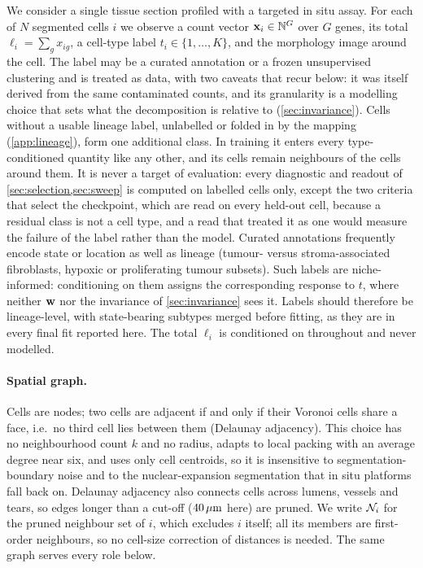  We consider a single tissue section profiled with a targeted in situ assay. For each of $N$ segmented cells $i$ we observe a count vector $\mathbf{x}_i \in \mathbb{N}^G$ over $G$ genes, its total $\ell_i = \sum_g x_{ig}$, a cell-type label $t_i \in \{1,\dots,K\}$, and the morphology image around the cell. The label may be a curated annotation or a frozen unsupervised clustering and is treated as data, with two caveats that recur below: it was itself derived from the same contaminated counts, and its granularity is a modelling choice that sets what the decomposition is relative to (\cref{sec:invariance}). Cells without a usable lineage label, unlabelled or folded in by the mapping (\cref{app:lineage}), form one additional class. In training it enters every type-conditioned quantity like any other, and its cells remain neighbours of the cells around them. It is never a target of evaluation: every diagnostic and readout of \cref{sec:selection,sec:sweep} is computed on labelled cells only, except the two criteria that select the checkpoint, which are read on every held-out cell, because a residual class is not a cell type, and a read that treated it as one would measure the failure of the label rather than the model. Curated annotations frequently encode state or location as well as lineage (tumour- versus stroma-associated fibroblasts, hypoxic or proliferating tumour subsets). Such labels are niche-informed: conditioning on them assigns the corresponding response to $t$, where neither $\mathbf{w}$ nor the invariance of \cref{sec:invariance} sees it. Labels should therefore be lineage-level, with state-bearing subtypes merged before fitting, as they are in every final fit reported here. The total $\ell_i$ is conditioned on throughout and never modelled.

\paragraph{Spatial graph.}
Cells are nodes; two cells are adjacent if and only if their Voronoi cells share a face, i.e.\ no third cell lies between them (Delaunay adjacency). This choice has no neighbourhood count $k$ and no radius, adapts to local packing with an average degree near six, and uses only cell centroids, so it is insensitive to segmentation-boundary noise and to the nuclear-expansion segmentation that in situ platforms fall back on. Delaunay adjacency also connects cells across lumens, vessels and tears, so edges longer than a cut-off ($40\,\mu\text{m}$ here) are pruned. We write $\mathcal{N}_{i}$ for the pruned neighbour set of $i$, which excludes $i$ itself; all its members are first-order neighbours, so no cell-size correction of distances is needed. The same graph serves every role below.

